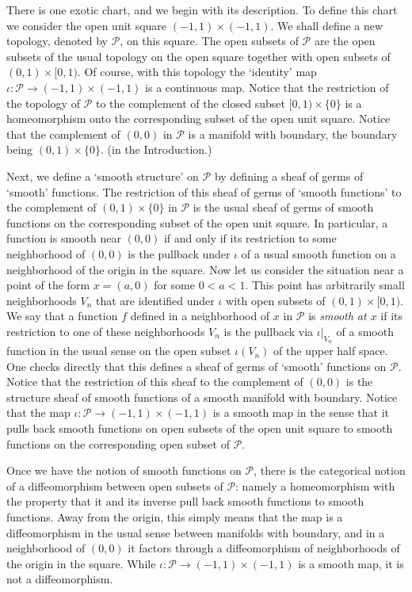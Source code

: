 There is one exotic chart, and we begin with its description. To
define this chart we consider the open unit square $(-1,1)\times
(-1,1)$. We shall define a new topology, denoted by ${\mathcal P}$,
on this square. The open subsets of ${\mathcal P}$ are the open
subsets of the usual topology on the open square together with open
subsets of $(0,1)\times [0,1)$. Of course, with this topology the
`identity' map $\iota\colon {\mathcal P}\to (-1,1)\times (-1,1)$  is
a continuous map. Notice that the restriction of the topology of
${\mathcal P}$ to the complement of the closed subset $[0,1)\times
\{0\}$ is a homeomorphism onto the corresponding subset of the open
unit square. Notice that the complement of $(0,0)$ in ${\mathcal P}$
is a manifold with boundary, the boundary being $(0,1)\times\{0\}$.
(in the Introduction.)

Next, we define a `smooth structure' on ${\mathcal P}$ by defining a
sheaf of germs of `smooth' functions. The restriction of this sheaf
of germs of `smooth functions'  to the complement of $(0,1)\times
\{0\}$ in ${\mathcal P}$ is the usual sheaf of germs of smooth
functions on the corresponding subset of the open unit square.
In particular, a function is smooth near $(0,0)$ if and only if its restriction
to some neighborhood of $(0,0)$ is the pullback under $\iota$
of a usual smooth function on a
neighborhood of the origin in the square.
 Now
let us consider the situation near a point of the form $x=(a,0)$ for
some $0<a<1$. This point has arbitrarily small neighborhoods $V_n$
that are identified under $\iota$ with open subsets of $(0,1)\times
[0,1)$. We say that a function  $f$ defined in a neighborhood of $x$
in ${\mathcal P}$ is {\em smooth at $x$} if its restriction to one
of these neighborhoods $V_n$ is the pullback via $\iota|_{V_n}$ of a
smooth function in the usual sense on the open subset $\iota(V_n)$
of the upper half space. One checks directly that this defines a
sheaf of germs of `smooth' functions on ${\mathcal P}$. Notice that
the restriction of this sheaf to the complement of $(0,0)$ is the
structure sheaf of smooth functions of a smooth manifold with
boundary. Notice that the map $\iota\colon {\mathcal P}\to
(-1,1)\times (-1,1)$ is a smooth map in the sense that it pulls back
smooth functions on open subsets of the open unit square to smooth
functions on the corresponding open subset of ${\mathcal P}$.



Once we have the notion of smooth functions on ${\mathcal P}$, there
is the categorical notion of a diffeomorphism between open subsets
of ${\mathcal P}$: namely a homeomorphism with the property that it
and its inverse pull back smooth functions to smooth functions. Away
from the origin, this simply means that the map is a diffeomorphism
in the usual sense between manifolds with boundary, and in a
neighborhood of $(0,0)$ it factors through a diffeomorphism of
neighborhoods of the origin  in the square. While $\iota\colon
{\mathcal P}\to (-1,1)\times (-1,1)$ is a smooth map, it is not a
diffeomorphism.


